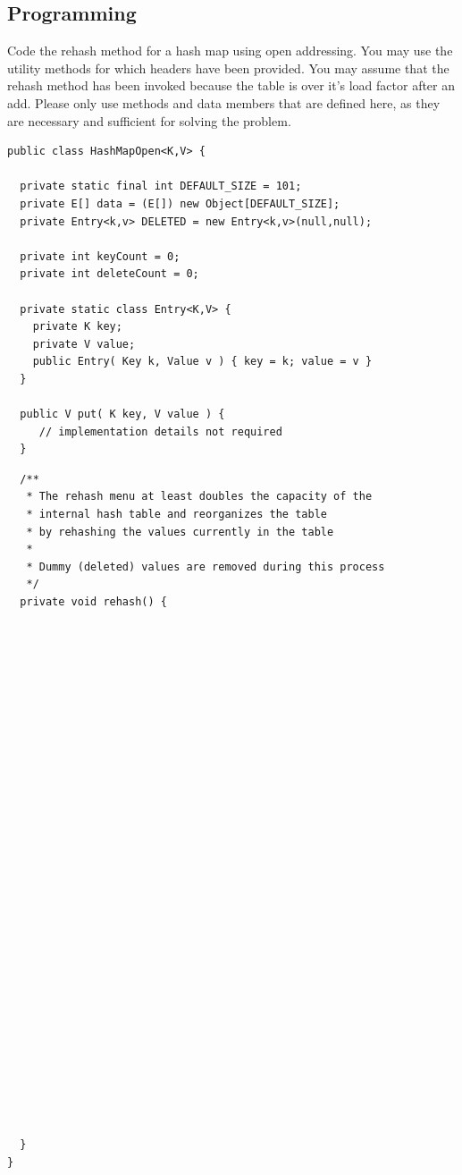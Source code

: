 \documentclass[11pt]{exam}
\begin{document}
\begin{questions}
\newpage

\section*{Programming}
\question[18] Code the rehash method for a hash map using open addressing.  You may use the utility methods for which headers have been provided.   You may assume that the rehash method has been invoked because the table is over it's load factor after an add.   Please only use methods and data members that are defined here, as they are necessary and sufficient for solving the problem.

\begin{verbatim}
public class HashMapOpen<K,V> {

  private static final int DEFAULT_SIZE = 101;
  private E[] data = (E[]) new Object[DEFAULT_SIZE];
  private Entry<k,v> DELETED = new Entry<k,v>(null,null);
	
  private int keyCount = 0;
  private int deleteCount = 0;
	
  private static class Entry<K,V> {
    private K key; 
    private V value;
    public Entry( Key k, Value v ) { key = k; value = v }
  }

  public V put( K key, V value ) {
     // implementation details not required
  }
\end{verbatim}	

\newpage

\begin{verbatim}
  /**
   * The rehash menu at least doubles the capacity of the 
   * internal hash table and reorganizes the table
   * by rehashing the values currently in the table
   *
   * Dummy (deleted) values are removed during this process
   */
  private void rehash() {
	










	
	
	
	
	
	
	
	
	
	
	
	
	
	
	
	
	
	
	
  }
}
	
\end{verbatim}


\end{questions}
\end{document}
